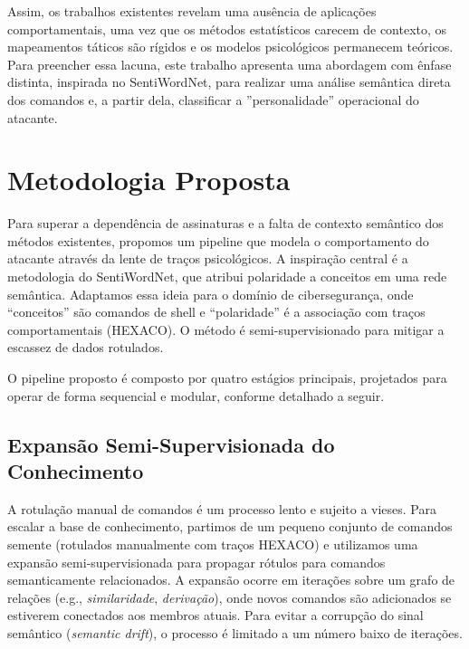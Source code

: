 \documentclass[12pt]{article}
\begin{document}
Assim, os trabalhos existentes revelam uma ausência de aplicações comportamentais, uma vez que os métodos estatísticos carecem de contexto, os mapeamentos táticos são rígidos e os modelos psicológicos permanecem teóricos. Para preencher essa lacuna, este trabalho apresenta uma abordagem com ênfase distinta, inspirada no SentiWordNet, para realizar uma análise semântica direta dos comandos e, a partir dela, classificar a ''personalidade'' operacional do atacante.



\section{Metodologia Proposta}
\label{sec:metodologia}

Para superar a dependência de assinaturas e a falta de contexto semântico dos métodos existentes, propomos um pipeline que modela o comportamento do atacante através da lente de traços psicológicos. A inspiração central é a metodologia do SentiWordNet, que atribui polaridade a conceitos em uma rede semântica. Adaptamos essa ideia para o domínio de cibersegurança, onde ``conceitos'' são comandos de shell e ``polaridade'' é a associação com traços comportamentais (HEXACO). O método é semi-supervisionado para mitigar a escassez de dados rotulados.

O pipeline proposto é composto por quatro estágios principais, projetados para operar de forma sequencial e modular, conforme detalhado a seguir.

\subsection{Expansão Semi-Supervisionada do Conhecimento}

A rotulação manual de comandos é um processo lento e sujeito a vieses. Para escalar a base de conhecimento, partimos de um pequeno conjunto de comandos semente (rotulados manualmente com traços HEXACO) e utilizamos uma expansão semi-supervisionada para propagar rótulos para comandos semanticamente relacionados. A expansão ocorre em iterações sobre um grafo de relações (e.g., \textit{similaridade}, \textit{derivação}), onde novos comandos são adicionados se estiverem conectados aos membros atuais. Para evitar a corrupção do sinal semântico (\textit{semantic drift}), o processo é limitado a um número baixo de iterações.
\end{document}

